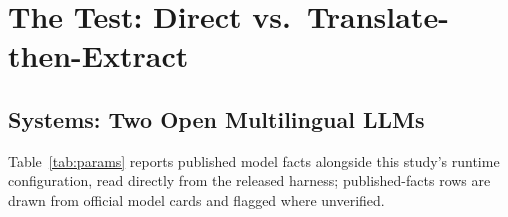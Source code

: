 \documentclass{llncs}
\begin{document}
\section{The Test: Direct vs.\ Translate-then-Extract}\label{sec:test}

\subsection{Systems: Two Open Multilingual LLMs}\label{sec:systems}
Table~\ref{tab:params} reports published model facts alongside this
study's runtime configuration, read directly from the released harness;
published-facts rows are drawn from official model cards and flagged where
unverified.
\end{document}
